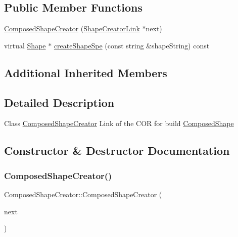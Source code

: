 \subsection*{Public Member Functions}
\begin{DoxyCompactItemize}
\item 
\hyperlink{class_composed_shape_creator_a6fc84212ed85e2a63c748faceb464a58}{Composed\+Shape\+Creator} (\hyperlink{class_shape_creator_link}{Shape\+Creator\+Link} $\ast$next)
\item 
virtual \hyperlink{class_shape}{Shape} $\ast$ \hyperlink{class_composed_shape_creator_a5a1ebce5d0d7509923e70d507dc57ff2}{create\+Shape\+Spe} (const string \&shape\+String) const
\end{DoxyCompactItemize}
\subsection*{Additional Inherited Members}


\subsection{Detailed Description}
Class \hyperlink{class_composed_shape_creator}{Composed\+Shape\+Creator} Link of the C\+OR for build \hyperlink{class_composed_shape}{Composed\+Shape} 

\subsection{Constructor \& Destructor Documentation}
\hypertarget{class_composed_shape_creator_a6fc84212ed85e2a63c748faceb464a58}{}\label{class_composed_shape_creator_a6fc84212ed85e2a63c748faceb464a58} 
\subsubsection{\texorpdfstring{Composed\+Shape\+Creator()}{ComposedShapeCreator()}}
{\footnotesize\ttfamily Composed\+Shape\+Creator\+::\+Composed\+Shape\+Creator (\begin{DoxyParamCaption}\item[{\hyperlink{class_shape_creator_link}{Shape\+Creator\+Link} $\ast$}]{next }\end{DoxyParamCaption})}


